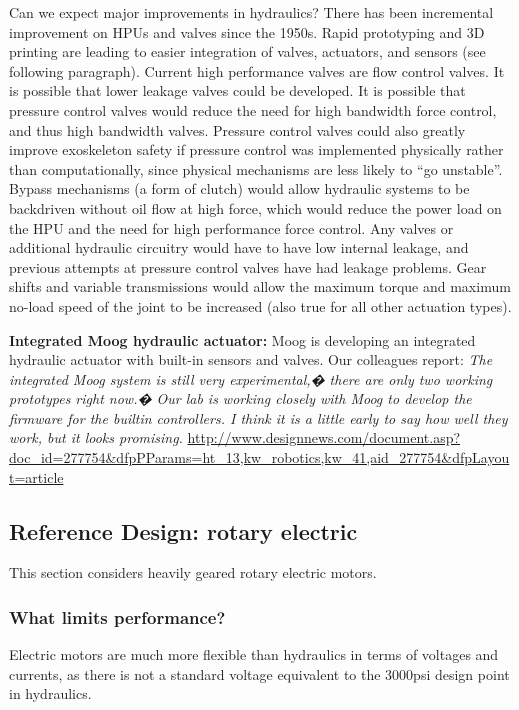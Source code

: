 \documentclass[letterpaper,12pt,fullpage]{article}
\begin{document}
Can we expect major improvements in hydraulics?
There has been incremental improvement on HPUs and valves since
the 1950s. Rapid prototyping and 3D printing are leading to
easier integration of valves, actuators, and sensors (see following
paragraph). Current high performance valves are flow control valves. It
is possible that lower leakage valves could be developed. It is possible
that pressure control valves would reduce the need for high bandwidth
force control, and thus high bandwidth valves. Pressure control valves
could also greatly improve exoskeleton safety if pressure control was
implemented physically rather than computationally, since physical
mechanisms are less likely to ``go unstable''.
Bypass mechanisms (a form of clutch) would allow hydraulic systems
to be backdriven without oil flow at high force, which would reduce
the power load on the HPU and the need for high performance force control.
Any valves or additional hydraulic circuitry
would have to have low internal leakage, and previous attempts at
pressure control valves have had leakage problems.
Gear shifts and variable transmissions would allow the maximum torque
and maximum no-load speed of the joint to be increased (also true
for all other actuation types).

{\bf Integrated Moog hydraulic actuator:}
Moog is developing an integrated hydraulic actuator with built-in
sensors and valves. Our colleagues report:
{\it The integrated Moog system is still very experimental,� there are
only two working prototypes right now.� Our lab is working closely
with Moog to develop the firmware for the builtin controllers. I
think it is a little early to say how well they work, but it looks
promising.}
\url{http://www.designnews.com/document.asp?doc_id=277754&dfpPParams=ht_13,kw_robotics,kw_41,aid_277754&dfpLayout=article}

\subsection{Reference Design: rotary electric}

This section considers heavily geared rotary electric motors.

\subsubsection{What limits performance?}

Electric motors are much more flexible than hydraulics in terms of voltages
and currents, as there is not a standard voltage equivalent to the 3000psi
design point in hydraulics.
\end{document}
